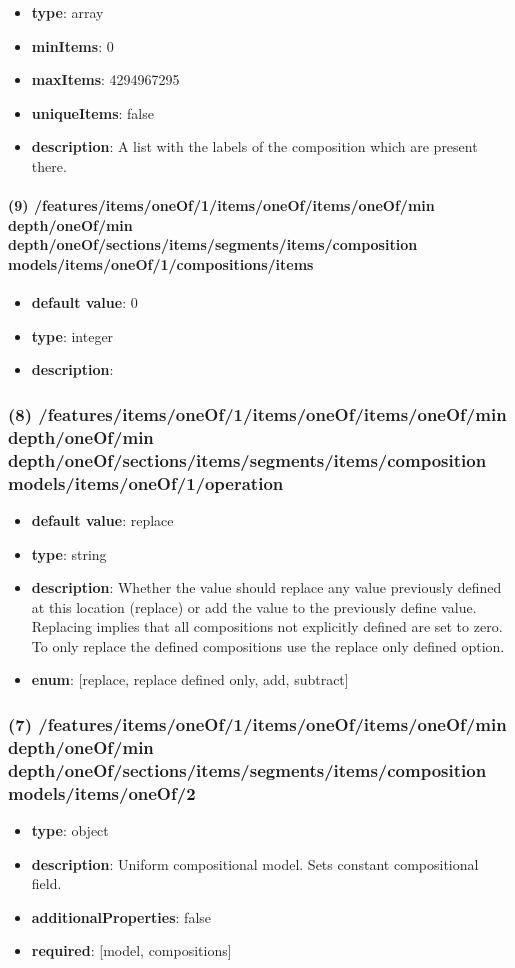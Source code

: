 \begin{itemize}[leftmargin=8em]\item {\bf type}: array
\item {\bf minItems}: 0
\item {\bf maxItems}: 4294967295
\item {\bf uniqueItems}: false
\item {\bf description}: A list with the labels of the composition which are present there.
\end{itemize}\paragraph{(9) /features/items/oneOf/1/items/oneOf/items/oneOf/min depth/oneOf/min depth/oneOf/sections/items/segments/items/composition models/items/oneOf/1/compositions/items}
\begin{itemize}[leftmargin=9em]\item {\bf default value}: 0
\item {\bf type}: integer
\item {\bf description}: 
\end{itemize}\subsubsection{(8) /features/items/oneOf/1/items/oneOf/items/oneOf/min depth/oneOf/min depth/oneOf/sections/items/segments/items/composition models/items/oneOf/1/operation}
\begin{itemize}[leftmargin=8em]\item {\bf default value}: replace
\item {\bf type}: string
\item {\bf description}: Whether the value should replace any value previously defined at this location (replace) or add the value to the previously define value. Replacing implies that all compositions not explicitly defined are set to zero. To only replace the defined compositions use the replace only defined option.
\item {\bf enum}: [replace, replace defined only, add, subtract]\end{itemize}\subsubsection{(7) /features/items/oneOf/1/items/oneOf/items/oneOf/min depth/oneOf/min depth/oneOf/sections/items/segments/items/composition models/items/oneOf/2}
\begin{itemize}[leftmargin=7em]\item {\bf type}: object
\item {\bf description}: Uniform compositional model. Sets constant compositional field.
\item {\bf additionalProperties}: false
\item {\bf required}: [model, compositions]\end{itemize}
